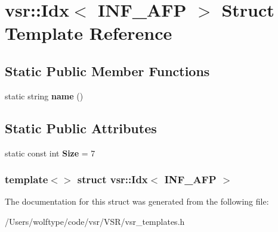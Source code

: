 \hypertarget{structvsr_1_1_idx_3_01_i_n_f___a_f_p_01_4}{\section{vsr\-:\-:Idx$<$ I\-N\-F\-\_\-\-A\-F\-P $>$ Struct Template Reference}
\label{structvsr_1_1_idx_3_01_i_n_f___a_f_p_01_4}
}
\subsection*{Static Public Member Functions}
\begin{DoxyCompactItemize}
\item 
\hypertarget{structvsr_1_1_idx_3_01_i_n_f___a_f_p_01_4_a85d3f95411df7a2a61b4b5e9b6165212}{static string {\bfseries name} ()}\label{structvsr_1_1_idx_3_01_i_n_f___a_f_p_01_4_a85d3f95411df7a2a61b4b5e9b6165212}

\end{DoxyCompactItemize}
\subsection*{Static Public Attributes}
\begin{DoxyCompactItemize}
\item 
\hypertarget{structvsr_1_1_idx_3_01_i_n_f___a_f_p_01_4_aff9ca2aacbcbec0c81d72a0d52296b62}{static const int {\bfseries Size} = 7}\label{structvsr_1_1_idx_3_01_i_n_f___a_f_p_01_4_aff9ca2aacbcbec0c81d72a0d52296b62}

\end{DoxyCompactItemize}
\subsubsection*{template$<$$>$ struct vsr\-::\-Idx$<$ I\-N\-F\-\_\-\-A\-F\-P $>$}



The documentation for this struct was generated from the following file\-:\begin{DoxyCompactItemize}
\item 
/\-Users/wolftype/code/vsr/\-V\-S\-R/vsr\-\_\-templates.\-h\end{DoxyCompactItemize}
